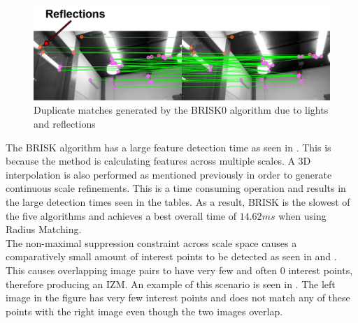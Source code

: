 \documentclass[11pt]{report}
\begin{document}
\begin{figure}
  \centering
    \includegraphics[width=1.0\textwidth]{../Drawings/Matching/reflectionsBrisk0_photo.jpg}
    \caption{Duplicate matches generated by the BRISK0 algorithm due to lights and reflections} 
    \label{fig:reflectionsBrisk0}
\end{figure}


The BRISK algorithm has a large feature detection time as seen in . This is because the method is calculating features across multiple scales. A 3D interpolation is also performed as mentioned previously in order to generate continuous scale refinements. This is a time consuming operation and results in the large detection times seen in the tables. As a result, BRISK is the slowest of the five algorithms and achieves a best overall time of $14.62 ms$ when using Radius Matching.\\



The non-maximal suppression constraint across scale space causes a comparatively small amount of interest points to be detected as seen in  and . This causes overlapping image pairs to have very few and often $0$ interest points, therefore producing an IZM. An example of this scenario is seen in . The left image in the figure has very few interest points and does not match any of these points with the right image even though the two images overlap.\\
\end{document}
